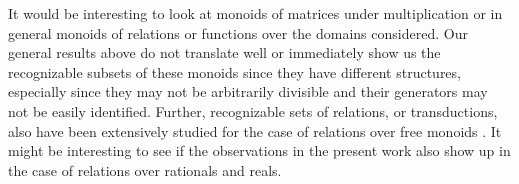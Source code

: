\documentclass{llncs}
\begin{document}
It would be interesting to look at monoids of matrices under multiplication or in general monoids of relations or functions over the domains considered. 
Our general results above do not translate well or immediately show us the recognizable subsets of these monoids since they have different structures, especially since they may not be arbitrarily divisible and their generators may not be easily identified. 
Further, recognizable sets of relations, or transductions, also have been extensively studied for the case of relations over free monoids \cite{eilenberg1974automata, sakarovitch2009elements}. 
It might be interesting to see if the observations in the present work also show up in the case of relations over rationals and reals.



\end{document}
